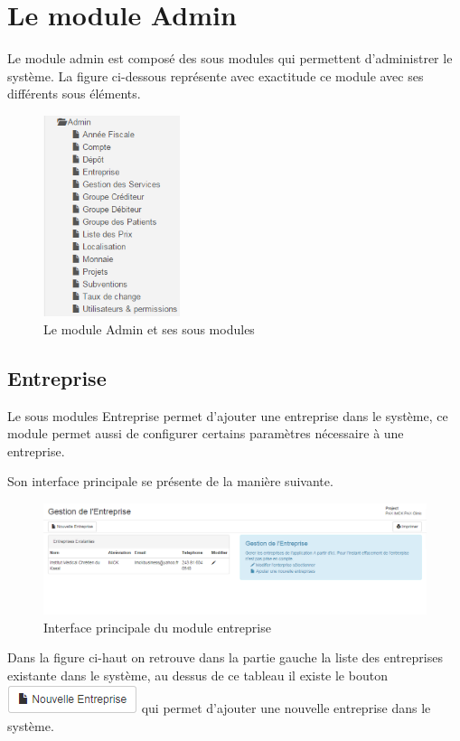 \documentclass[12pt,a4paper]{report}
\begin{document}
\chapter{Le module Admin}        
Le module admin est composé des sous modules qui permettent d'administrer le système. La figure ci-dessous représente avec exactitude ce module avec ses différents sous éléments.
\begin{figure}[h]
\begin{center}
\includegraphics[width=4cm]{pic/s_admin.png}
\end{center}
\caption{Le module Admin et ses sous modules}
\label{Le module Admin et ses sous menus}
\end{figure} 

\section{Entreprise}
Le sous modules Entreprise permet d'ajouter une entreprise dans le système, ce module permet aussi de configurer certains paramètres nécessaire à une entreprise.

Son interface principale se présente de la manière suivante.

\begin{figure}[h]
\begin{center}
\includegraphics[width=14cm]{pic/ModuleEntreprise.png}
\end{center}
\caption{Interface principale du module entreprise}
\label{Interface principale du module entreprise}
\end{figure} 
\newpage
Dans la figure ci-haut on retrouve dans la partie gauche la liste des entreprises existante dans le système, au dessus de ce tableau il existe le bouton \includegraphics[scale=1]{pic/New_Entre.png} qui permet d'ajouter une nouvelle entreprise dans le système.
\end{document}

